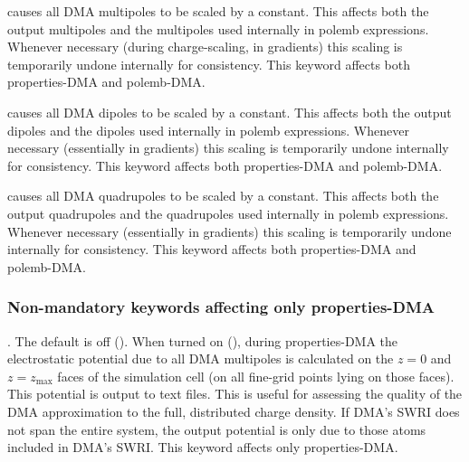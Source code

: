 \documentclass[letterpaper,10pt,english]{sphinxmanual}
\begin{document}
 \textendash{} causes all DMA multipoles to be
scaled by a constant. This affects both the output multipoles and the
multipoles used internally in polemb expressions. Whenever necessary
(during charge-scaling, in gradients) this scaling is temporarily undone
internally for consistency. This keyword affects both properties-DMA and
polemb-DMA.

 \textendash{} causes all DMA dipoles to be scaled by a
constant. This affects both the output dipoles and the dipoles used
internally in polemb expressions. Whenever necessary (essentially in
gradients) this scaling is temporarily undone internally for
consistency. This keyword affects both properties-DMA and polemb-DMA.

 \textendash{} causes all DMA quadrupoles to be
scaled by a constant. This affects both the output quadrupoles and the
quadrupoles used internally in polemb expressions. Whenever necessary
(essentially in gradients) this scaling is temporarily undone internally
for consistency. This keyword affects both properties-DMA and
polemb-DMA.


\subsubsection{Non-mandatory keywords affecting only properties-DMA}
\label{\detokenize{hfx:non-mandatory-keywords-affecting-only-properties-dma}}
. The default is off (). When
turned on (), during properties-DMA the electrostatic potential due
to all DMA  multipoles is calculated on the \(z=0\) and
\(z=z_\textrm{max}\) faces of the simulation cell (on all fine-grid
points lying on those faces). This potential is output to text files.
This is useful for assessing the quality of the DMA approximation to the
full, distributed charge density. If DMA’s SWRI does not span the entire
system, the output potential is only due to those atoms included in
DMA’s SWRI. This keyword affects only properties-DMA.
\end{document}
